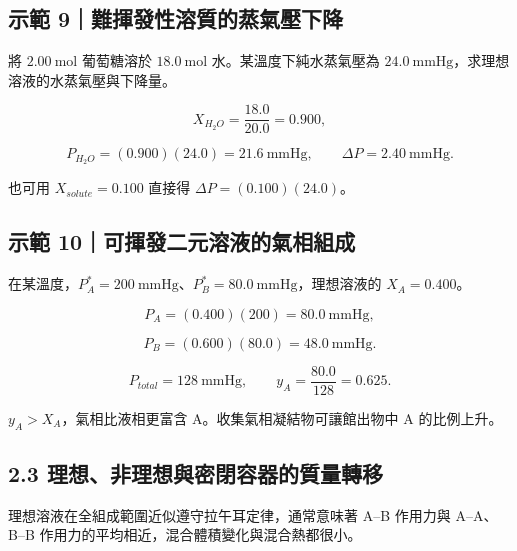 \documentclass[11pt,a4paper]{article}
\begin{document}
\begin{HandoutWorkedExample}

\subsection{示範 9｜難揮發性溶質的蒸氣壓下降}\label{ux793aux7bc4-9ux96e3ux63eeux767cux6027ux6eb6ux8ceaux7684ux84b8ux6c23ux58d3ux4e0bux964d}

將 \(2.00\ \mathrm{mol}\) 葡萄糖溶於 \(18.0\ \mathrm{mol}\) 水。某溫度下純水蒸氣壓為 \(24.0\ \mathrm{mmHg}\)，求理想溶液的水蒸氣壓與下降量。

\[
X_{H_2O}=\frac{18.0}{20.0}=0.900,
\]

\[
P_{H_2O}=(0.900)(24.0)=21.6\ \mathrm{mmHg},\qquad
\Delta P=2.40\ \mathrm{mmHg}.
\]

也可用 \(X_{solute}=0.100\) 直接得 \(\Delta P=(0.100)(24.0)\)。

\end{HandoutWorkedExample}

\begin{HandoutWorkedExample}

\subsection{示範 10｜可揮發二元溶液的氣相組成}\label{ux793aux7bc4-10ux53efux63eeux767cux4e8cux5143ux6eb6ux6db2ux7684ux6c23ux76f8ux7d44ux6210}

在某溫度，\(P_A^*=200\ \mathrm{mmHg}\)、\(P_B^*=80.0\ \mathrm{mmHg}\)，理想溶液的 \(X_A=0.400\)。

\[
P_A=(0.400)(200)=80.0\ \mathrm{mmHg},
\]

\[
P_B=(0.600)(80.0)=48.0\ \mathrm{mmHg}.
\]

\[
P_{total}=128\ \mathrm{mmHg},\qquad y_A=\frac{80.0}{128}=0.625.
\]

\(y_A>X_A\)，氣相比液相更富含 A。收集氣相凝結物可讓館出物中 A 的比例上升。

\end{HandoutWorkedExample}

\subsection{2.3 理想、非理想與密閉容器的質量轉移}\label{ux7406ux60f3ux975eux7406ux60f3ux8207ux5bc6ux9589ux5bb9ux5668ux7684ux8ceaux91cfux8f49ux79fb}

理想溶液在全組成範圍近似遵守拉午耳定律，通常意味著 A--B 作用力與 A--A、B--B 作用力的平均相近，混合體積變化與混合熱都很小。
\end{document}
